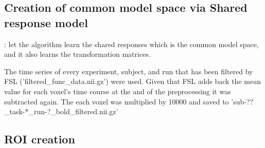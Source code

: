 \subsection{Creation of common model space via Shared response model}

\citep{chen2015reduced}: let the algorithm learn the shared responses which is
the common model space, and it also learns the transformation matrices.
%







%
The time series of every experiment, subject, and run that has been filtered
by FSL ('filtered\_func\_data.nii.gz') were used.
%
Given that FSL adds back the mean value for each voxel's time course at the
and of the preprocessing it was subtracted again.
%
The each voxel was multiplied by 10000%
and saved to 'sub-??\_task-*\_run-?\_bold\_filtered.nii.gz'

\subsection{ROI creation}




